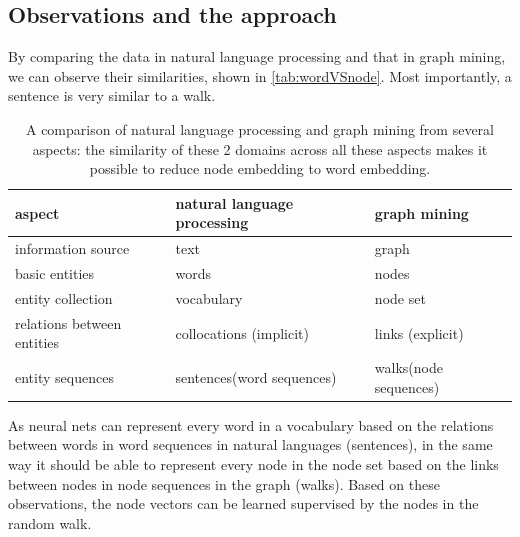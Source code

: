 \documentclass{article}
\begin{document}
\subsection{Observations and the approach}

By comparing the data in natural language processing and that in graph mining, we can observe their similarities, shown in \autoref{tab:wordVSnode}. Most importantly, a sentence is very similar to a walk.

\begin{table}[h]
	\centering
	\begin{tabularx}{\textwidth}{ |X|X|X| } \hline
		aspect  & natural language processing & graph mining \\ \hline
		information source & text & graph \\ \hline
		basic entities & words & nodes \\ \hline
		entity collection & vocabulary & node set \\ \hline
		relations between entities & collocations (implicit) & links (explicit) \\ \hline
		entity sequences & sentences(word sequences) & walks(node sequences) \\ \hline
	\end{tabularx}
	\caption{A comparison of natural language processing and graph mining from several aspects: the similarity of these 2 domains across all these aspects makes it possible to reduce node embedding to word embedding.}
	\label{tab:wordVSnode}
\end{table}

As neural nets can represent every word in a vocabulary based on the relations between words in word sequences in natural languages (sentences), in the same way it should be able to represent every node in the node set based on the links between nodes in node sequences in the graph (walks). Based on these observations, the node vectors can be learned supervised by the nodes in the random walk.
\end{document}
